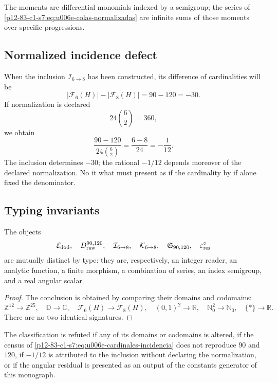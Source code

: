 {The moments are differential monomials indexed by a semigroup; the
series of \eqref{p12-83-c1-s7:eq:u006e-colas-normalizadas} are infinite sums of those
moments over specific progressions.

\subsection{Normalized incidence defect}

When the inclusion \(\mathcal I_{6\to8}\) has been constructed, its
difference of cardinalities will be
\[
 |\mathcal F_6(H)|-|\mathcal F_8(H)|=90-120=-30.
\]
If normalization is declared
\[
 24\binom62=360,
\]
we obtain
\begin{equation}
 \frac{90-120}{24\binom62}
 =\frac{6-8}{24}
 =-\frac1{12}.
 \label{p12-83-c1-s7:eq:u006e-defecto-normalizado}
\end{equation}
The inclusion determines \(-30\); the rational \(-1/12\) depends moreover of
the declared normalization. No it what must present as if the cardinality
by if alone fixed the denominator.

\subsection{Typing invariants}

\begin{theorem}
\label{p12-83-c1-s7:thm:u006e-separacion-seis-objetos}
The objects
\begin{equation}
 \mathcal E_{\rm dod},\quad
 D_{\rm raw}^{90,120},\quad
 \mathcal I_{6\to8},\quad
 \mathcal K_{6\to8},\quad
 \mathfrak S_{90,120},\quad
 \varepsilon_{\rm res}^{\circ}
 \label{p12-83-c1-s7:eq:u006e-seis-objetos}
\end{equation}
are mutually distinct by type: they are, respectively, an integer reader,
an analytic function, a finite morphism, a combination of series, an
index semigroup, and a real angular scalar.
\end{theorem}

\begin{proof}
The conclusion is obtained by comparing their domains and codomains:
\[
 \mathbb Z^{12}\to\mathbb Z^{25},\quad
 \mathbb D\to\mathbb C,\quad
 \mathcal F_6(H)\to\mathcal F_8(H),\quad
 (0,1)^2\to\mathbb R,\quad
 \mathbb N_0^2\to\mathbb N_0,\quad
 \{\ast\}\to\mathbb R.
\]
There are no two identical signatures.
\end{proof}

\begin{criterion}
\label{p12-83-c1-s7:crit:u006e-refutacion}
The classification is refuted if any of its domains or
codomains is altered, if the census of
\eqref{p12-83-c1-s7:eq:u006e-cardinales-incidencia} does not reproduce \(90\) and \(120\), if
\(-1/12\) is attributed to the inclusion without declaring the normalization, or if
the angular residual is presented as an output of the constants generator of
this monograph.
\end{criterion}


}
